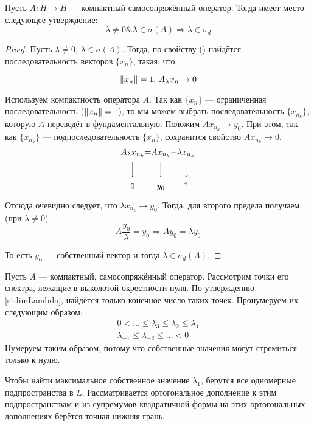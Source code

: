\documentclass[12pt]{article}
\begin{document}
	\begin{theorem}
		Пусть $A: H \rightarrow H$ --- компактный самосопряжённый оператор. Тогда имеет место следующее утверждение:
		$$\lambda \neq 0 \& \lambda \in \sigma(A) \Rightarrow \lambda \in \sigma_d $$
	\end{theorem}
	\begin{proof}
		Пусть $\lambda \neq 0,\, \lambda \in \sigma(A)$. Тогда, по свойству (\label{eq:specCrit}) найдётся последовательность 
		векторов $\{x_n\}$, такая, что:
		
		$$\left\| x_n \right\| = 1,\, A_{\lambda}x_n \rightarrow 0$$
		
		Используем компактность оператора $A$. Так как $\{x_n\}$ --- ограниченная последовательность ($\left\| x_n \right\| = 1$), то
		мы можем выбрать последовательность $\{x_{n_k}\}$, которую $A$ переведёт в фундаментальную. 
		Положим $Ax_{n_k}\rightarrow y_0$. При этом, так как $\{x_{n_k}\}$ --- подпоследовательность $\{x_{n}\}$, 
		сохранится свойство $Ax_{n_k} \rightarrow 0$.
		$$
		\begin{CD}
			A_{\lambda}x_{n_k} @.=@. Ax_{n_k} @.-@. \lambda x_{n_k} \\
			@VVV @. @VVV @. @VVV \\
			0 @.@. y_0 @.@. ?
		\end{CD}
		$$
		
		Отсюда очевидно следует, что $\lambda x_{n_k} \rightarrow y_0$. Тогда, для второго предела получаем (при $\lambda \neq 0$)
		$$A\dfrac{y_0}{\lambda} = y_0 \Rightarrow Ay_0 = \lambda y_0$$
		
		То есть $y_0$ --- собственный вектор и тогда $\lambda \in \sigma_d(A)$.
	\end{proof}
	
	Пусть $A$ --- компактный, самосопряжённый оператор. Рассмотрим точки его спектра, лежащие в выколотой окрестности нуля. 
	По утверждению \ref{st:limLambda}, найдётся только конечное число таких точек. Пронумеруем их следующим образом:
	\begin{gather*}
		0 < \dots \leq \lambda_3 \leq \lambda_2 \leq \lambda_1 \\
		\lambda_{-1} \leq \lambda_{-2} \leq \dots < 0
	\end{gather*}
	Нумеруем таким образом, потому что собственные значения могут стремиться только к нулю.
	
	
	Чтобы найти максимальное собственное значение $\lambda_1$, берутся все одномерные подпространства в $L$. 
	Рассматривается ортогональное дополнение к этим подпространствам и из супремумов квадратичной формы на
	этих ортогональных дополнениях берётся точная нижняя грань.
	
\end{document}
